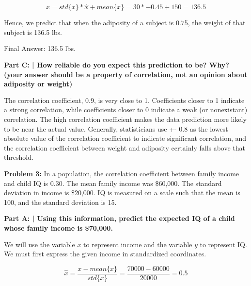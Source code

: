 \documentclass{article}
\begin{document}
 \begin{displaymath}
    x = std\{x\}*\hat{x} + mean\{x\} = 30 * -0.45 + 150 = 136.5
 \end{displaymath}
 
 Hence, we predict that when the adiposity of a subject is 0.75, the weight of that subject is 136.5 lbs.\newline
 
 Final Answer: 136.5 lbs.\newline
 
 \textbf{Part C: | How reliable do you expect this prediction to be? Why? (your answer should be a property of correlation, not an opinion
about adiposity or weight)}\newline
 
 The correlation coefficient, 0.9, is very close to 1. Coefficients closer to 1 indicate a strong correlation, while coefficients closer to 0 indicate a weak (or nonexistant) correlation. The high correlation coefficient makes the data prediction more likely to be near the actual value. Generally, statisticians use +- 0.8 as the lowest absolute value of the correlation coefficient to indicate significant correlation, and the correlation coefficient between weight and adiposity certainly falls above that threshold. \newline
 
 \newpage

 \begin{center}
      \Large\textbf{Problem 3:} In a population, the correlation coefficient between family income and child IQ is 0.30. The mean family income was \$60,000. The standard deviation in income is \$20,000. IQ is measured on a scale such that the mean is 100, and the standard deviation is 15.\par
 \end{center}

 \textbf{Part A: | Using this information, predict the expected IQ of a child whose family income is \$70,000.}\newline
 
 We will use the variable $x$ to represent income and the variable $y$ to represent IQ. We must first express the given income in standardized coordinates.\newline
 
 \begin{displaymath}
    \hat{x} = \frac{x - mean\{x\}}{std\{x\}} = \frac{70000 - 60000}{20000} = 0.5
 \end{displaymath}
 
\end{document}
